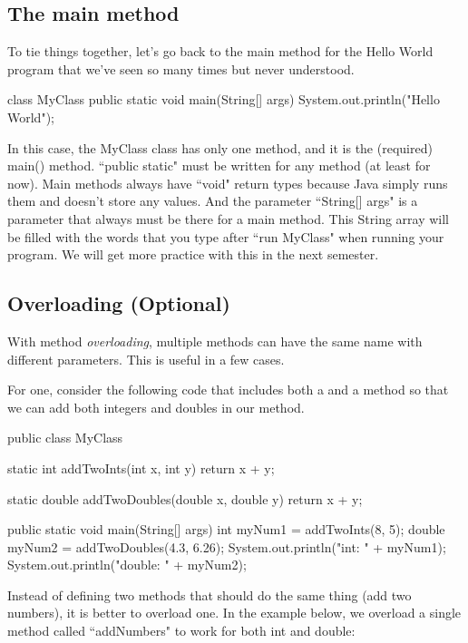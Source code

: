 \subsection{The main method}
To tie things together, let's go back to the main method for the Hello World program that we've seen so many times but never understood.

\begin{code}
class MyClass {
  public static void main(String[] args) {
    System.out.println("Hello World");
  }
}
\end{code}

In this case, the MyClass class has only one method, and it is the (required) main() method. ``public static" must be written for any method (at least for now). Main methods always have ``void" return types because Java simply runs them and doesn't store any values. And the parameter ``String[] args" is a parameter that always must be there for a main method. This String array will be filled with the words that you type after ``run MyClass" when running your program. We will get more practice with this in the next semester.  

\subsection{Overloading (Optional)}

With method \emph{overloading}, multiple methods can have the same name with different parameters. This is useful in a few cases.

For one, consider the following code that includes both a  and a  method so that we can add both integers and doubles in our  method. 

\begin{code}
public class MyClass{
  static int addTwoInts(int x, int y) {
    return x + y;
  }

  static double addTwoDoubles(double x, double y) {
    return x + y;
  }

  public static void main(String[] args) {
    int myNum1 = addTwoInts(8, 5);
    double myNum2 = addTwoDoubles(4.3, 6.26);
    System.out.println("int: " + myNum1);
    System.out.println("double: " + myNum2);
  }
}
\end{code}

Instead of defining two methods that should do the same thing (add two numbers), it is better to overload one. In the example below, we overload a single method called ``addNumbers" to work for both int and double:

